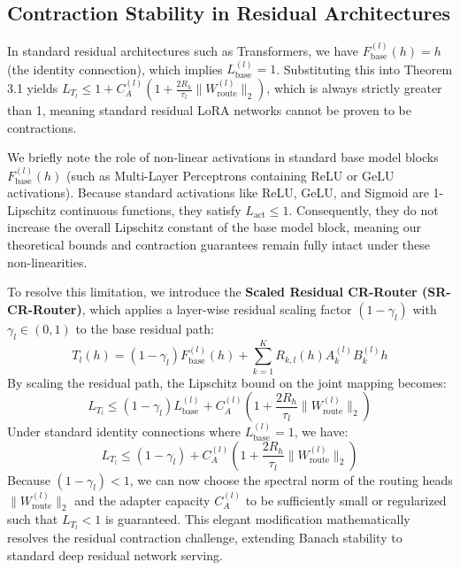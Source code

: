 \subsection{Contraction Stability in Residual Architectures}
In standard residual architectures such as Transformers, we have $F_{\text{base}}^{(l)}(h) = h$ (the identity connection), which implies $L_{\text{base}}^{(l)} = 1$. Substituting this into Theorem 3.1 yields $L_{T_l} \le 1 + C_A^{(l)} \left(1 + \frac{2 R_h}{\tau_l} \|W_{\text{route}}^{(l)}\|_2 \right)$, which is always strictly greater than 1, meaning standard residual LoRA networks cannot be proven to be contractions.

We briefly note the role of non-linear activations in standard base model blocks $F_{\text{base}}^{(l)}(h)$ (such as Multi-Layer Perceptrons containing ReLU or GeLU activations). Because standard activations like ReLU, GeLU, and Sigmoid are 1-Lipschitz continuous functions, they satisfy $L_{\text{act}} \le 1$. Consequently, they do not increase the overall Lipschitz constant of the base model block, meaning our theoretical bounds and contraction guarantees remain fully intact under these non-linearities.

To resolve this limitation, we introduce the \textbf{Scaled Residual CR-Router (SR-CR-Router)}, which applies a layer-wise residual scaling factor $(1 - \gamma_l)$ with $\gamma_l \in (0, 1)$ to the base residual path:
\begin{equation}
T_l(h) = (1 - \gamma_l) F_{\text{base}}^{(l)}(h) + \sum_{k=1}^K R_{k, l}(h) A_k^{(l)} B_k^{(l)} h
\end{equation}
By scaling the residual path, the Lipschitz bound on the joint mapping becomes:
\begin{equation}
L_{T_l} \le (1 - \gamma_l) L_{\text{base}}^{(l)} + C_A^{(l)} \left( 1 + \frac{2 R_h}{\tau_l} \|W_{\text{route}}^{(l)}\|_2 \right)
\end{equation}
Under standard identity connections where $L_{\text{base}}^{(l)} = 1$, we have:
\begin{equation}
L_{T_l} \le (1 - \gamma_l) + C_A^{(l)} \left( 1 + \frac{2 R_h}{\tau_l} \|W_{\text{route}}^{(l)}\|_2 \right)
\end{equation}
Because $(1 - \gamma_l) < 1$, we can now choose the spectral norm of the routing heads $\|W_{\text{route}}^{(l)}\|_2$ and the adapter capacity $C_A^{(l)}$ to be sufficiently small or regularized such that $L_{T_l} < 1$ is guaranteed. This elegant modification mathematically resolves the residual contraction challenge, extending Banach stability to standard deep residual network serving.

